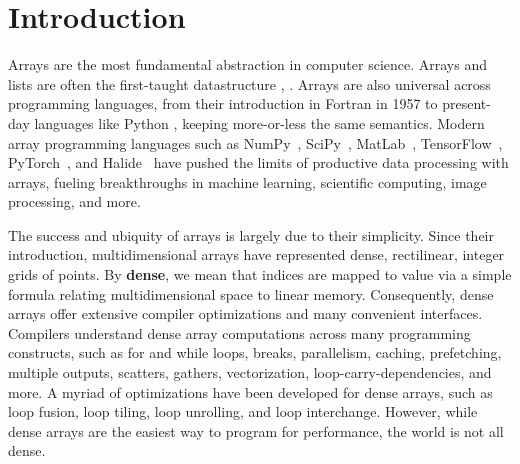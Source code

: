 
\section{Introduction}

Arrays are the most fundamental abstraction in computer science. Arrays and lists are often the first-taught datastructure
\cite[Chapter 2.2]{abelson_structure_1996}, \cite[Chapter 2.2]{knuth_art_1997}.
%
Arrays are also universal across programming languages, from their introduction
in Fortran in 1957 to present-day languages like Python
\cite{backus_fortran_1957}, keeping more-or-less the same semantics.
%
Modern array programming languages such as NumPy~\cite{harris_array_2020},
SciPy~\cite{virtanen_scipy_2020}, MatLab~\cite{moler_history_2020},
TensorFlow~\cite{abadi_tensorflow_2016}, PyTorch~\cite{paszke_pytorch_2019}, and
Halide~\cite{ragan-kelley_halide_2013} have pushed the limits of productive data
processing with arrays, fueling breakthroughs in machine learning, scientific
computing, image processing, and more.

The success and ubiquity of arrays is largely due to their simplicity. 
%
Since their introduction, multidimensional arrays have represented dense, rectilinear,
integer grids of points. 
%
By \textbf{dense}, we mean that indices are mapped to value via a simple formula relating multidimensional space to linear memory.
%
Consequently, dense arrays offer extensive compiler optimizations and many convenient interfaces.
%
%
Compilers understand dense array computations across many
programming constructs, such as for and while loops, breaks, parallelism,
caching, prefetching, multiple outputs, scatters, gathers, vectorization,
loop-carry-dependencies, and more. A myriad of optimizations have been developed for
dense arrays, such as loop fusion, loop tiling, loop unrolling, and loop
interchange.
%
However, while dense arrays are the easiest way to program for performance, the world is not all dense.

